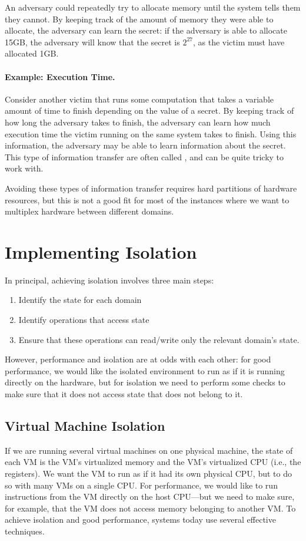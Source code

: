 An adversary could repeatedly try to allocate memory until the system tells them they cannot. By keeping track of the amount of memory they were able to allocate, the adversary can learn the secret: if the adversary is able to allocate 15GB, the adversary will know that the secret is $2^{27}$, as the victim must have allocated 1GB.

\paragraph{Example: Execution Time.} Consider another victim that runs some computation that takes a variable amount of time to finish depending on the value of a secret. By keeping track of how long the adversary takes to finish, the adversary can learn how much execution time the victim running on the same system takes to finish. Using this information, the adversary may be able to learn information about the secret. This type of information transfer are often called , and can be quite tricky to work with.

Avoiding these types of information transfer requires hard partitions of hardware resources, but this is not a good fit for most of the instances where we want to multiplex hardware between different domains.

\section{Implementing Isolation}
In principal, achieving isolation involves three main steps:
\begin{enumerate}
	\item Identify the state for each domain
	\item Identify operations that access state
	\item Ensure that these operations can read/write only the relevant domain's state.
\end{enumerate}

However, performance and isolation are at odds with each other: for good performance, we would like the isolated environment to run as if it is running directly on the hardware, but for isolation we need to perform some checks to make sure that it does not access state that does not belong to it.

\subsection{Virtual Machine Isolation}
If we are running several virtual machines on one physical machine, the state of each VM is the VM's virtualized memory and the VM's virtualized CPU (i.e., the registers). We want the VM to run as if it had its own physical CPU, but to do so with many VMs on a single CPU. For performance, we would like to run instructions from the VM directly on the host CPU---but we need to make sure, for example, that the VM does not access memory belonging to another VM. To achieve isolation and good performance, systems today use several effective techniques.

